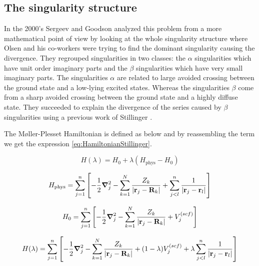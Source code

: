 \documentclass[11pt,a4paper]{article}
\begin{document}
{\subsection{The singularity structure}

In the 2000's Sergeev and Goodson \cite{Sergeev_2005, Sergeev_2006}  analyzed this problem from a more mathematical point of view by looking at the whole singularity structure where Olsen and his co-workers were trying to find the dominant singularity causing the divergence. They regrouped singularities in two classes: the $\alpha$ singularities which have unit order imaginary parts and the $\beta$ singularities which have very small imaginary parts. The singularities $\alpha$ are related to large avoided crossing between the ground state and a low-lying excited states. Whereas the singularities $\beta$ come from a sharp avoided crossing between the ground state and a highly diffuse state. They succeeded to explain the divergence of the series caused by $\beta$ singularities using a previous work of Stillinger \cite{Stillinger_2000}. 

The M{\o}ller-Plesset Hamiltonian is defined as below and by reassembling the term we get the expression \eqref{eq:HamiltonianStillinger}.

\begin{equation}
H(\lambda)=H_0 + \lambda (H_\text{phys} - H_0)    
\end{equation}

\begin{equation}
    H_\text{phys}=\sum\limits_{j=1}^{n}\left[ -\frac{1}{2}\grad_j^2 - \sum\limits_{k=1}^{N} \frac{Z_k}{|\vb{r}_j-\vb{R}_k|}+\sum\limits_{j<l}^{n}\frac{1}{|\vb{r}_j-\vb{r}_l|}\right]
\end{equation}

\begin{equation}
    H_0=\sum\limits_{j=1}^{n}\left[ -\frac{1}{2}\grad_j^2 - \sum\limits_{k=1}^{N} \frac{Z_k}{|\vb{r}_j-\vb{R}_k|}+V_j^{(scf)}\right]
\end{equation}

\begin{equation}
    H(\lambda)=\sum\limits_{j=1}^{n}\left[-\frac{1}{2}\grad_j^2 - \sum\limits_{k=1}^{N} \frac{Z_k}{|\vb{r}_j-\vb{R}_k|} + (1-\lambda)V_j^{(scf)}+\lambda\sum\limits_{j<l}^{n}\frac{1}{|\vb{r}_j-\vb{r}_l|} \right]
\label{eq:HamiltonianStillinger}
\end{equation}

}
\end{document}
